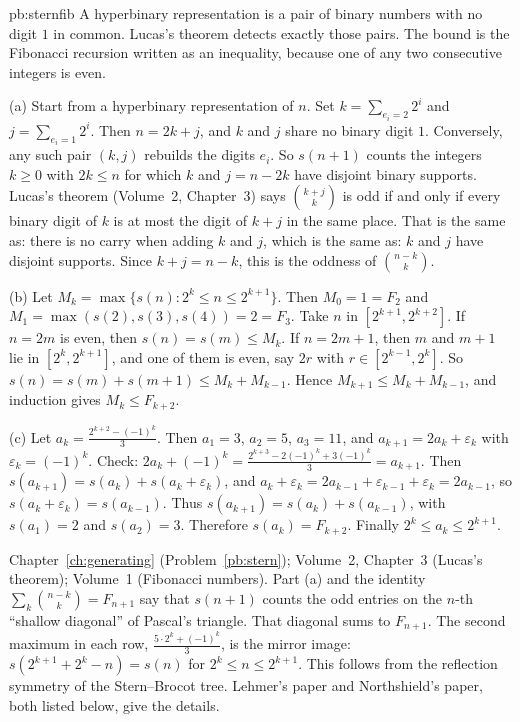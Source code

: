 \begin{solution}{pb:sternfib}
\idea A hyperbinary representation is a pair of binary numbers with no digit $1$ in common. Lucas's theorem detects exactly those pairs.
The bound is the Fibonacci recursion written as an inequality, because one of any two consecutive integers is even.

\writeup (a) Start from a hyperbinary representation of $n$. Set $k=\sum_{e_i=2}2^i$ and $j=\sum_{e_i=1}2^i$. Then $n=2k+j$, and $k$ and $j$
share no binary digit $1$. Conversely, any such pair $(k,j)$ rebuilds the digits $e_i$. So $s(n+1)$ counts the integers $k\ge0$
with $2k\le n$ for which $k$ and $j=n-2k$ have disjoint binary supports. Lucas's theorem (Volume~2, Chapter~3) says $\binom{k+j}k$ is odd if
and only if every binary digit of $k$ is at most the digit of $k+j$ in the same place. That is the same as: there is no carry when adding
$k$ and $j$, which is the same as: $k$ and $j$ have disjoint supports. Since $k+j=n-k$, this is the oddness of $\binom{n-k}k$.

(b) Let $M_k=\max\{s(n):2^k\le n\le2^{k+1}\}$. Then $M_0=1=F_2$ and $M_1=\max(s(2),s(3),s(4))=2=F_3$. Take $n$ in $[2^{k+1},2^{k+2}]$. If
$n=2m$ is even, then $s(n)=s(m)\le M_k$. If $n=2m+1$, then $m$ and $m+1$ lie in $[2^k,2^{k+1}]$, and one of them is even, say $2r$
with $r\in[2^{k-1},2^k]$. So $s(n)=s(m)+s(m+1)\le M_k+M_{k-1}$. Hence $M_{k+1}\le M_k+M_{k-1}$, and induction gives $M_k\le F_{k+2}$.

(c) Let $a_k=\frac{2^{k+2}-(-1)^k}3$. Then $a_1=3$, $a_2=5$, $a_3=11$, and $a_{k+1}=2a_k+\varepsilon_k$ with $\varepsilon_k=(-1)^k$. Check:
$2a_k+(-1)^k=\frac{2^{k+3}-2(-1)^k+3(-1)^k}3=a_{k+1}$. Then $s(a_{k+1})=s(a_k)+s(a_k+\varepsilon_k)$, and
$a_k+\varepsilon_k=2a_{k-1}+\varepsilon_{k-1}+\varepsilon_k=2a_{k-1}$, so $s(a_k+\varepsilon_k)=s(a_{k-1})$. Thus $s(a_{k+1})=s(a_k)+s(a_{k-1})$, with
$s(a_1)=2$ and $s(a_2)=3$. Therefore $s(a_k)=F_{k+2}$. Finally $2^k\le a_k\le2^{k+1}$.

\tools Chapter~\ref{ch:generating} (Problem~\ref{pb:stern}); Volume~2, Chapter~3 (Lucas's theorem); Volume~1 (Fibonacci numbers).
\leads Part (a) and the identity $\sum_k\binom{n-k}k=F_{n+1}$ say that $s(n+1)$ counts the odd entries on the $n$-th ``shallow diagonal''
of Pascal's triangle. That diagonal sums to $F_{n+1}$. The second maximum in each row, $\frac{5\cdot2^k+(-1)^k}3$, is the
mirror image: $s(2^{k+1}+2^k-n)=s(n)$ for $2^k\le n\le2^{k+1}$. This follows from the reflection symmetry of the Stern--Brocot tree.
Lehmer's paper and Northshield's paper, both listed below, give the details.
\end{solution}

